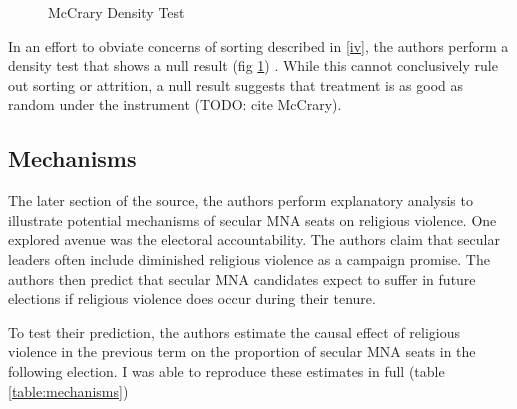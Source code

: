 \documentclass{scrartcl}
\begin{document}
\begin{figure}[h]
  \centering
  \caption{McCrary Density Test}
  \label{fig:density}
\end{figure}

In an effort to obviate concerns of sorting described in \ref{iv}, the authors perform a density test that shows a null result (fig \ref{fig:density}) \cite{mccrary_2008}.
While this cannot conclusively rule out sorting or attrition, a null result suggests that treatment is as good as random under the instrument (TODO: cite McCrary). 

\subsection{Mechanisms}

The later section of the source, the authors perform explanatory analysis to illustrate potential mechanisms of secular MNA seats on religious violence. One explored avenue was the electoral accountability. The authors claim that secular leaders often include diminished religious violence as a campaign promise. The authors then predict that secular MNA candidates expect to suffer in future elections if religious violence does occur during their tenure. 

To test their prediction, the authors estimate the causal effect of religious violence in the previous term on the proportion of secular MNA seats in the following election.
I was able to reproduce these estimates in full (table \ref{table:mechanisms})
\end{document}

